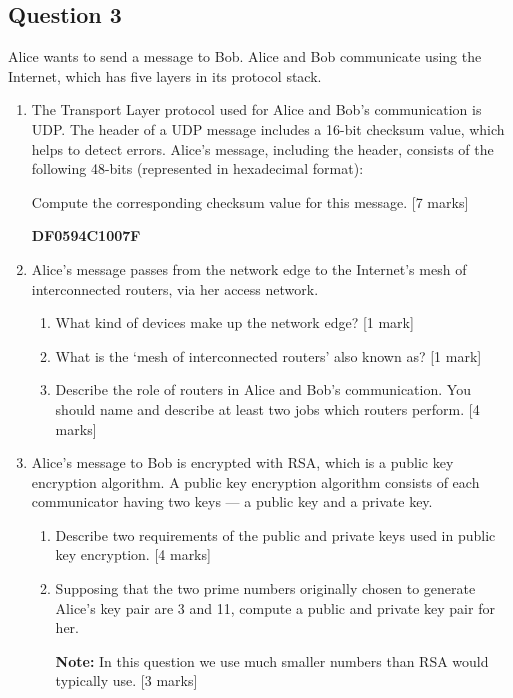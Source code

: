 \subsection{Question 3}
Alice wants to send a message to Bob. Alice and Bob communicate using the Internet, which has five layers in its protocol stack.
\begin{enumerate}[label=(\alph*)]
    \item The Transport Layer protocol used for Alice and Bob’s communication is UDP. The header of a UDP message includes a 16-bit checksum value, which helps to detect errors. Alice’s message, including the header, consists of the following 48-bits (represented in hexadecimal format): 

    Compute the corresponding checksum value for this message.
    \hfill [7 marks]
    \begin{center}
       \textbf{DF0594C1007F}
    \end{center}
    \item Alice’s message passes from the network edge to the Internet’s mesh of interconnected routers, via her access network.

    \begin{enumerate}[label=(\roman*)]
        \item What kind of devices make up the network edge? \hfill [1 mark]

        \item What is the ‘mesh of interconnected routers’ also known as? \hfill [1 mark]

        \item Describe the role of routers in Alice and Bob’s communication. You should name and describe at least two jobs which routers perform. \hfill [4 marks]
    \end{enumerate}

    \item Alice’s message to Bob is encrypted with RSA, which is a public key encryption algorithm. A public key encryption algorithm consists of each communicator having two keys — a public key and a private key.

    \begin{enumerate}[label=(\roman*)]
        \item Describe two requirements of the public and private keys used in public key encryption. \hfill [4 marks]

        \item Supposing that the two prime numbers originally chosen to generate Alice’s key pair are 3 and 11, compute a public and private key pair for her.

        \textbf{Note:} In this question we use much smaller numbers than RSA would typically use. \hfill [3 marks]
    \end{enumerate}
\end{enumerate}

